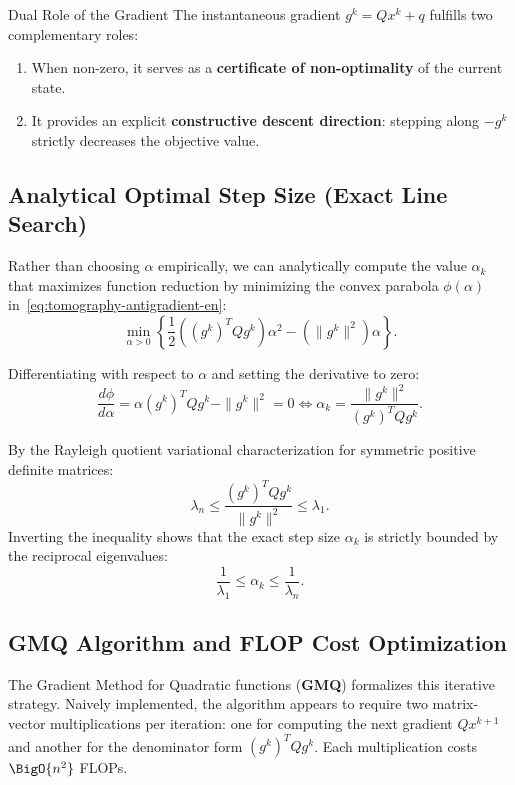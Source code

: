 \begin{noteblock}{Dual Role of the Gradient}
The instantaneous gradient $g^k = Q x^k + q$ fulfills two complementary roles:
\begin{enumerate}
    \item When non-zero, it serves as a \textbf{certificate of non-optimality} of the current state.
    \item It provides an explicit \textbf{constructive descent direction}: stepping along $-g^k$ strictly decreases the objective value.
\end{enumerate}
\end{noteblock}

\subsection{Analytical Optimal Step Size (Exact Line Search)}
Rather than choosing $\alpha$ empirically, we can analytically compute the value $\alpha_k$ that maximizes function reduction by minimizing the convex parabola $\phi(\alpha)$ in~\eqref{eq:tomography-antigradient-en}:
\begin{equation}
    \min_{\alpha > 0} \left\{ \frac{1}{2} \left( (g^k)^T Q g^k \right) \alpha^2 - \left( \|g^k\|^2 \right) \alpha \right\}.
\end{equation}

Differentiating with respect to $\alpha$ and setting the derivative to zero:
\begin{equation}
    \frac{d\phi}{d\alpha} = \alpha (g^k)^T Q g^k - \|g^k\|^2 = 0 \iff \alpha_k = \frac{\|g^k\|^2}{(g^k)^T Q g^k}.
    \label{eq:optimal-stepsize-en}
\end{equation}

\begin{property}
By the Rayleigh quotient variational characterization for symmetric positive definite matrices:
\begin{equation}
    \lambda_n \le \frac{(g^k)^T Q g^k}{\|g^k\|^2} \le \lambda_1.
\end{equation}
Inverting the inequality shows that the exact step size $\alpha_k$ is strictly bounded by the reciprocal eigenvalues:
\begin{equation}
    \frac{1}{\lambda_1} \le \alpha_k \le \frac{1}{\lambda_n}.
\end{equation}
\end{property}

\subsection{GMQ Algorithm and FLOP Cost Optimization}
The Gradient Method for Quadratic functions (\textbf{GMQ}) formalizes this iterative strategy. Naively implemented, the algorithm appears to require two matrix-vector multiplications per iteration: one for computing the next gradient $Q x^{k+1}$ and another for the denominator form $(g^k)^T Q g^k$. Each multiplication costs $\BigO{n^2}$ FLOPs.


